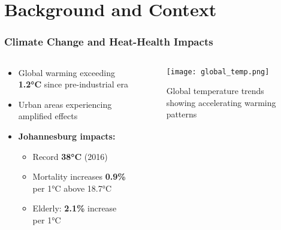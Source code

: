 \documentclass[aspectratio=169]{beamer}
\newcommand{\statistic}[1]{\textcolor{witsaccent}{\textbf{#1}}}
\begin{document}
\section{Background and Context}

\begin{frame}
    \frametitle{Climate Change and Heat-Health Impacts}
    
    \begin{columns}[T]
        \begin{column}{0.55\textwidth}
            \begin{itemize}[leftmargin=*, itemsep=8pt]
                \item Global warming exceeding \statistic{1.2°C} since pre-industrial era
                \item Urban areas experiencing amplified effects
                \item \textbf{Johannesburg impacts:}
                \begin{itemize}[itemsep=6pt]
                    \item Record \statistic{38°C} (2016)
                    \item Mortality increases \statistic{0.9\%} per 1°C above 18.7°C
                    \item Elderly: \statistic{2.1\%} increase per 1°C
                \end{itemize}
            \end{itemize}
            
        \end{column}
        \begin{column}{0.42\textwidth}
            \begin{figure}
                \texttt{[image: global\_temp.png]}
                \caption{\small Global temperature trends showing accelerating warming patterns}
            \end{figure}
        \end{column}
    \end{columns}
\end{frame}
\end{document}
